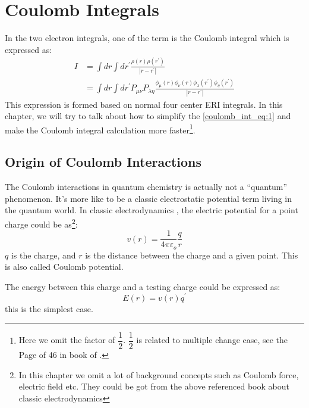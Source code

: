 %
%
\chapter{Coulomb Integrals}
%
%
In the two electron integrals, one of the term is the Coulomb integral which
is expressed as:
\begin{align}
\label{coulomb_int_eq:1}
 I &= \int dr \int dr^{'} \frac{\rho(r)\rho(r^{'})}{|r-r^{'}|} \nonumber \\
   &= \int dr \int dr^{'} P_{\mu\nu}P_{\lambda\eta}
   \frac{\phi_{\mu}(r)\phi_{\nu}(r)\phi_{\lambda}(r^{'})\phi_{\eta}(r^{'})}{|r-r^{'}|}
\end{align}
This expression is formed based on normal four center ERI integrals. In this
chapter, we will try to talk about how to simplify the \ref{coulomb_int_eq:1}
and make the Coulomb integral calculation more faster\footnote{Here we omit
the factor of $\dfrac{1}{2}$. $\dfrac{1}{2}$ is related to multiple change case, see
the Page of 46 in book of \cite{jackson_classic_electrodynamics}.}.

\section{Origin of Coulomb Interactions}
%
%
%
The Coulomb interactions in quantum chemistry is actually not a ``quantum''
phenomenon. It's more like to be a classic electrostatic potential term living
in the quantum world. In classic electrodynamics
\cite{jackson_classic_electrodynamics}, the electric potential for a point
charge could be as\footnote{In this chapter we omit a lot of background concepts
such as Coulomb force, electric field etc. They could be got from the above
referenced book about classic electrodynamics}:
\begin{equation}
 v(r) = \frac{1}{4\pi\varepsilon_{o}}\frac{q}{r}
\end{equation}
$q$ is the charge, and $r$ is the distance between the charge and a given point.
This is also called Coulomb potential.

The energy between this charge and a testing charge could be expressed as:
\begin{equation}
 E(r) = v(r)q^{'}
\end{equation}
this is the simplest case.

